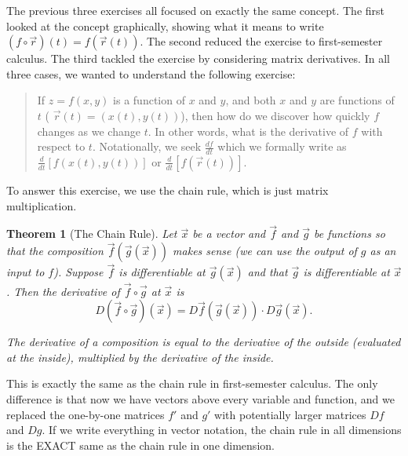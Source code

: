 \documentclass[10pt,]{book}
\theoremstyle{plain}
\newtheorem{theorem}{Theorem}[section]
\theoremstyle{definition}
\theoremstyle{definition}
\theoremstyle{definition}
\theoremstyle{definition}
\theoremstyle{definition}
\numberwithin{equation}{section}
\newcommand{\ds}{\displaystyle}
\begin{document}
The previous three exercises all focused on exactly the same concept. The first looked at the concept graphically, showing what it means to write \((f\circ \vec r)(t)=f(\vec r(t))\). The second reduced the exercise to first-semester calculus. The third tackled the exercise by considering matrix derivatives. In all three cases, we wanted to understand the following exercise:%
\begin{quote}\hypertarget{blockquote-3}{}
If \(z=f(x,y)\) is a function of \(x\) and \(y\), and both \(x\) and \(y\) are functions of \(t\) ( \(\vec r(t)=(x(t),y(t))\)), then how do we discover how quickly \(f\) changes as we change \(t\). In other words, what is the derivative of \(f\) with respect to \(t\). Notationally, we seek \(\ds \frac{df}{dt}\) which we formally write as \(\ds \frac{d}{dt}[f(x(t),y(t))]\) or \(\ds \frac{d}{dt} [f(\vec r(t))].\)\end{quote}
To answer this exercise, we use the chain rule, which is just matrix multiplication.%
\begin{theorem}[{The Chain Rule}]\label{def_chain_rule}
Let \(\vec x\) be a vector and \(\vec f\) and \(\vec g\) be functions so that the composition \(\vec f(\vec g(\vec x))\) makes sense (we can use the output of \(g\) as an input to \(f\)). Suppose \(\vec f\) is differentiable at \(\vec g(\vec x)\) and that \(\vec g\) is differentiable at \(\vec x\). Then the derivative of \(\vec f\circ \vec g\) at \(\vec x\) is%
\begin{equation*}
D(\vec f\circ \vec g)(\vec x) = D\vec f(\vec g(\vec x))\cdot D\vec g(\vec x).
\end{equation*}
%
\par
The derivative of a composition is equal to the derivative of the outside (evaluated at the inside), multiplied by the derivative of the inside.%
\end{theorem}
This is exactly the same as the chain rule in first-semester calculus. The only difference is that now we have vectors above every variable and function, and we replaced the one-by-one matrices \(f'\) and \(g'\) with potentially larger matrices \(Df\) and \(Dg\). If we write everything in vector notation, the chain rule in all dimensions is the EXACT same as the chain rule in one dimension.%
\end{document}
